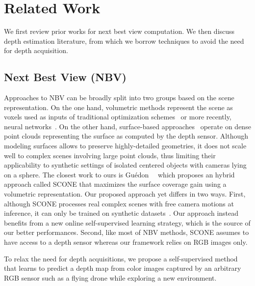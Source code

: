 \section{Related Work}
\label{sec:relatedwork}

We first review prior works for next best view computation. We then discuss depth estimation literature, from which we borrow techniques to avoid the need for depth acquisition.

\subsection{Next Best View (NBV)}
Approaches to NBV can be broadly split into two groups based on the scene representation. On the one hand, volumetric methods represent the scene as voxels used as inputs of traditional optimization schemes~\cite{potthast-14-probabilistic-framework, vasquez-14-volumetric-nbv, charrow-15-information, bissmarck-15-efficient-nbv, vasquez-17-view-state-planning, daudelin-17-adaptable-probabilistic, cieslewski-17-ICIRS, wang-20-efficient-autonomous} or more recently, neural networks~\cite{hepp-corr18-learntoscore, mendoza-prl2020, vasquez-21-3DCNN}. 
On the other hand, surface-based approaches~\cite{chen-smc05-visionsensorplanning, kriegel-11-surface-based, kriegel-12-next-best-scan, lee-tra20-mechanical-parts, zeng-icirs20-pcnbv} operate on dense point clouds representing the surface as computed by the depth sensor. Although modeling surfaces allows to preserve highly-detailed geometries, it does not scale well to complex scenes involving large point clouds, thus limiting their applicability to synthetic settings of isolated centered objects with cameras lying on a sphere. The closest work to ours is Guédon~\etal~\cite{guedon-nips22-scone-surface-coverage} which proposes an hybrid approach called SCONE that maximizes the surface coverage gain using a volumetric representation. Our proposed approach yet differs in two ways. First, although SCONE processes real complex scenes with free camera motions at inference, it can only be trained on synthetic datasets~\cite{shapenet2015}. Our approach instead benefits from a new online self-supervised learning strategy, which is the source of our better performances. Second, like most of NBV methods, SCONE assumes to have access to a depth sensor whereas our framework relies on RGB images only.

To relax the need for depth acquisitions, we propose a self-supervised method that learns to predict a depth map from color images captured by an arbitrary RGB sensor such as a flying drone while exploring a new environment.

